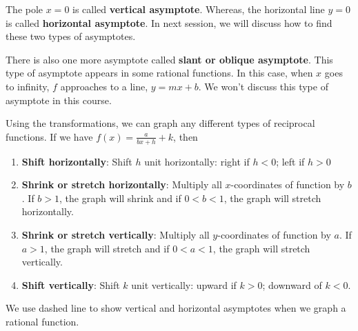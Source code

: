 The pole $x=0$ is called \textbf{vertical asymptote}. Whereas,  the horizontal line $y=0$ is called \textbf{horizontal asymptote}. In next session, we will discuss how to find these two types of asymptotes. 
\begin{nt}
    There is also one more asymptote called \textbf{slant or oblique asymptote}. This type of asymptote appears in  some rational functions. In this case, when $x$ goes to infinity, $f$ approaches to a line, $y=mx+b$. We won't discuss this type of asymptote in this course.
\end{nt}
\begin{nt}
    Using the transformations, we can graph any different types of reciprocal functions. If we have $\displaystyle f(x)= \frac{a}{bx+h}+k$, then
    \begin{enumerate}
        \item \textbf{Shift horizontally}: Shift $h$ unit horizontally: right if $h<0$; left if $h>0$
        \item \textbf{Shrink or stretch horizontally}: Multiply all $x$-coordinates of function by $b$. If $b>1$, the graph will shrink and if $0<b<1$, the graph will stretch horizontally.
        \item \textbf{Shrink or stretch vertically}: Multiply all $y$-coordinates of function by $a$. If $a>1$, the graph will stretch and if $0<a<1$, the graph will stretch vertically.
        \item \textbf{Shift vertically}: Shift $k$ unit vertically: upward if $k>0$; downward of $k<0$.
    \end{enumerate}
\end{nt}
\begin{nt}
    We use dashed line to show vertical and horizontal asymptotes when we graph a rational function.
\end{nt}
